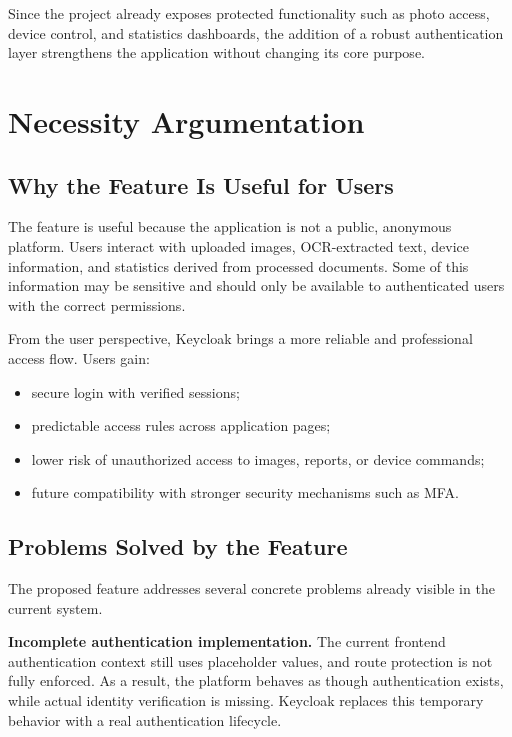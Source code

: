 \documentclass[conference]{IEEEtran}
\begin{document}
Since the project already exposes protected functionality such as photo access, device control, and statistics dashboards, the addition of a robust authentication layer strengthens the application without changing its core purpose.

\section{Necessity Argumentation}

\subsection{Why the Feature Is Useful for Users}

The feature is useful because the application is not a public, anonymous platform. Users interact with uploaded images, OCR-extracted text, device information, and statistics derived from processed documents. Some of this information may be sensitive and should only be available to authenticated users with the correct permissions.

From the user perspective, Keycloak brings a more reliable and professional access flow. Users gain:

\begin{itemize}
\item secure login with verified sessions;
\item predictable access rules across application pages;
\item lower risk of unauthorized access to images, reports, or device commands;
\item future compatibility with stronger security mechanisms such as MFA.
\end{itemize}

\subsection{Problems Solved by the Feature}

The proposed feature addresses several concrete problems already visible in the current system.

\textbf{Incomplete authentication implementation.} The current frontend authentication context still uses placeholder values, and route protection is not fully enforced. As a result, the platform behaves as though authentication exists, while actual identity verification is missing. Keycloak replaces this temporary behavior with a real authentication lifecycle.
\end{document}
